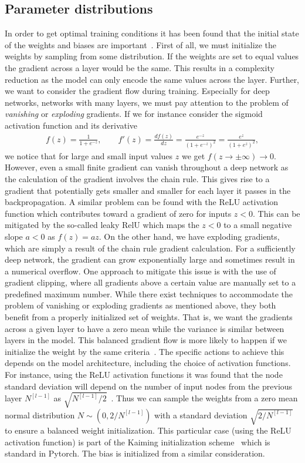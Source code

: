 \subsection{Parameter distributions}
In order to get optimal training conditions it has been found that the initial
state of the weights and biases are important~\cite{salimans2016weight}. First of all, we must initialize the weights by sampling from some distribution. If the weights are set
to equal values the gradient across a layer would be the same. This results in a
complexity reduction as the model can only encode the same values across the
layer. Further, we want to consider the gradient flow during training. Especially for deep networks, networks with many layers, we must pay attention to the problem of \textit{vanishing} or \textit{exploding} gradients. If we for instance consider the sigmoid activation function and its derivative 
\begin{align*}
  f(z) = \frac{1}{1 + e^{-z}}, \qquad f'(z) = \frac{df(z)}{dz} = \frac{e^{-z}}{(1+e^{-z})^2} = \frac{e^{z}}{(1+e^{z})^2},
\end{align*}
we notice that for large and small input values $z$ we get $f(z\to \pm\infty)
\to 0$. However, even a small finite gradient can vanish throughout a deep
network as the calculation of the gradient involves the chain rule. This gives
rise to a gradient that potentially gets smaller and smaller for each layer it
passes in the backpropagation. A similar problem can be found with the ReLU
activation function which contributes toward a gradient of zero for inputs
$z<0$. This can be mitigated by the so-called leaky RelU which maps the $z<0$ to
a small negative slope $a<0$ as $f(z) = az$. On the other hand, we have
exploding gradients, which are simply a result of the chain rule gradient
calculation. For a sufficiently deep network, the gradient can grow
exponentially large and sometimes result in a numerical overflow. One approach
to mitigate this issue is with the use of gradient clipping, where all gradients above
a certain value are manually set to a predefined maximum number. While there
exist techniques to accommodate the problem of vanishing or exploding gradients
as mentioned above, they both benefit from a properly initialized set of
weights. That is, we want the gradients across a given layer to have a zero mean
while the variance is similar between layers in the model. This balanced
gradient flow is more likely to happen if we initialize the weight by the same
criteria~\cite{salimans2016weight}. The specific actions to achieve this depends
on the model architecture, including the choice of activation functions. For
instance, using the ReLU activation functions it was found that the node
standard deviation will depend on the number of input nodes from the previous
layer $N^{[l-1]}$ as $\sqrt{N^{[l-1]}/2}$~\cite{he2015delving}. Thus we can sample the weights from a zero mean normal distribution $N \sim (0,
2/N^{[l-1]})$ with a standard deviation $\sqrt{2/N^{[l-1]}}$ to ensure a balanced weight initialization. This particular case (using the ReLU activation function) is part of the Kaiming initialization scheme~\cite{he2015delving} which is standard in Pytorch.
The bias is initialized from a similar consideration.

